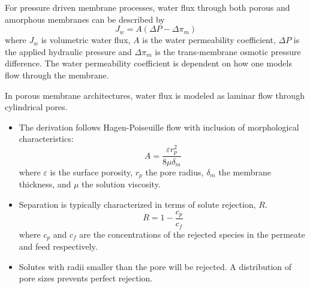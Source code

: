   For pressure driven membrane processes, water flux through both porous and 
  amorphous membranes can be described by
  \begin{equation}
  J_w = A(\Delta P - \Delta \pi_m)
  \end{equation}
  where $J_w$ is volumetric water flux, $A$ is the water permeability coefficient,
  $\Delta P$ is the applied hydraulic pressure and $\Delta \pi_m$ is the 
  trans-membrane osmotic pressure difference. The water permeability coefficient
  is dependent on how one models flow through the membrane.

  In porous membrane architectures, water flux is modeled as laminar flow through 
  cylindrical pores.
  \begin{itemize}
    \item The derivation follows Hagen-Poiseuille flow with inclusion of morphological
    characteristics:
    \begin{equation}
      A = \frac{\varepsilon r_p^2}{8\mu\delta_m}
    \end{equation}
    where $\varepsilon$ is the surface porosity, $r_p$ the pore radius, $\delta_m$ the
    membrane thickness, and $\mu$ the solution viscosity.
    \item Separation is typically characterized in terms of solute rejection, $R$. 
    \begin{equation}
      R = 1 - \frac{c_p}{c_f}
    \end{equation}
    where $c_p$ and $c_f$ are the concentrations of the rejected species in
    the permeate and feed respectively.
    \item Solutes with radii smaller than the pore will be rejected. A distribution of 
    pore sizes prevents perfect rejection.
  \end{itemize}
  
